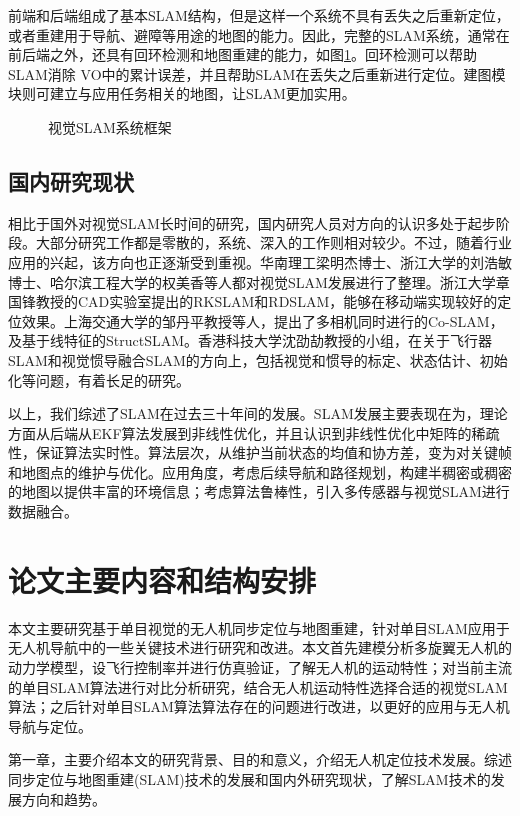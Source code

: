 前端和后端组成了基本SLAM结构，但是这样一个系统不具有丢失之后重新定位，或者重建用于导航、避障等用途的地图的能力。因此，完整的SLAM系统，通常在前后端之外，还具有回环检测和地图重建的能力，如图\ref{fig1.2}。回环检测可以帮助SLAM消除 VO中的累计误差，并且帮助SLAM在丢失之后重新进行定位。建图模块则可建立与应用任务相关的地图，让SLAM更加实用。
\begin{figure}[h]
\centering
\caption{视觉SLAM系统框架}
\label{fig1.2}
\end{figure}

\subsection{国内研究现状}
相比于国外对视觉SLAM长时间的研究，国内研究人员对方向的认识多处于起步阶段。大部分研究工作都是零散的，系统、深入的工作则相对较少。不过，随着行业应用的兴起，该方向也正逐渐受到重视。华南理工梁明杰博士\upcite{}、浙江大学的刘浩敏博士\upcite{}、哈尔滨工程大学的权美香\upcite{}等人都对视觉SLAM发展进行了整理。浙江大学章国锋教授的CAD实验室提出的RKSLAM\upcite{}和RDSLAM\upcite{}，能够在移动端实现较好的定位效果。上海交通大学的邹丹平教授等人，提出了多相机同时进行的Co-SLAM\upcite{}，及基于线特征的StructSLAM\upcite{}。香港科技大学沈劭劼教授的小组，在关于飞行器SLAM和视觉惯导融合SLAM的方向上，包括视觉和惯导的标定、状态估计、初始化等问题，有着长足的研究\upcite{}。


以上，我们综述了SLAM在过去三十年间的发展。SLAM发展主要表现在为，理论方面从后端从EKF算法发展到非线性优化，并且认识到非线性优化中矩阵的稀疏性，保证算法实时性。算法层次，从维护当前状态的均值和协方差，变为对关键帧和地图点的维护与优化。应用角度，考虑后续导航和路径规划，构建半稠密或稠密的地图以提供丰富的环境信息；考虑算法鲁棒性，引入多传感器与视觉SLAM进行数据融合。

\section{论文主要内容和结构安排}
本文主要研究基于单目视觉的无人机同步定位与地图重建，针对单目SLAM应用于无人机导航中的一些关键技术进行研究和改进。本文首先建模分析多旋翼无人机的动力学模型，设飞行控制率并进行仿真验证，了解无人机的运动特性；对当前主流的单目SLAM算法进行对比分析研究，结合无人机运动特性选择合适的视觉SLAM算法；之后针对单目SLAM算法算法存在的问题进行改进，以更好的应用与无人机导航与定位。

第一章，主要介绍本文的研究背景、目的和意义，介绍无人机定位技术发展。综述同步定位与地图重建(SLAM)技术的发展和国内外研究现状，了解SLAM技术的发展方向和趋势。

